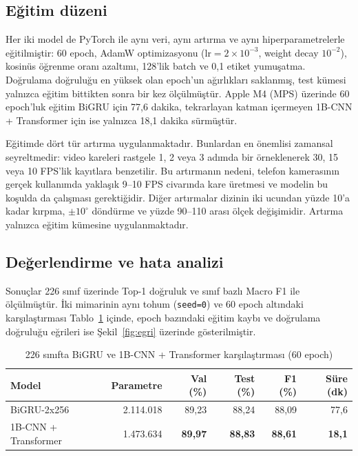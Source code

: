\subsection{Eğitim düzeni}

Her iki model de PyTorch ile aynı veri, aynı artırma ve aynı hiperparametrelerle
eğitilmiştir: 60 epoch, AdamW optimizasyonu ($\text{lr}=2\times10^{-3}$, weight
decay $10^{-2}$), kosinüs öğrenme oranı azaltımı, 128'lik batch ve 0,1 etiket
yumuşatma. Doğrulama doğruluğu en yüksek olan epoch'un ağırlıkları saklanmış,
test kümesi yalnızca eğitim bittikten sonra bir kez ölçülmüştür. Apple M4 (MPS)
üzerinde 60 epoch'luk eğitim BiGRU için 77,6 dakika, tekrarlayan katman
içermeyen 1B-CNN + Transformer için ise yalnızca 18,1 dakika sürmüştür.

Eğitimde dört tür artırma uygulanmaktadır. Bunlardan en önemlisi zamansal
seyreltmedir: video kareleri rastgele 1, 2 veya 3 adımda bir örneklenerek 30, 15
veya 10 FPS'lik kayıtlara benzetilir. Bu artırmanın nedeni, telefon kamerasının
gerçek kullanımda yaklaşık 9--10 FPS civarında kare üretmesi ve modelin bu
koşulda da çalışması gerektiğidir. Diğer artırmalar dizinin iki ucundan yüzde
10'a kadar kırpma, $\pm10^\circ$ döndürme ve yüzde 90--110 arası ölçek
değişimidir. Artırma yalnızca eğitim kümesine uygulanmaktadır.

\subsection{Değerlendirme ve hata analizi}

Sonuçlar 226 sınıf üzerinde Top-1 doğruluk ve sınıf bazlı Macro F1 ile
ölçülmüştür. İki mimarinin aynı tohum (\texttt{seed=0}) ve 60 epoch altındaki
karşılaştırması Tablo~\ref{tab:karsilastirma} içinde, epoch bazındaki eğitim
kaybı ve doğrulama doğruluğu eğrileri ise Şekil~\ref{fig:egri} üzerinde
gösterilmiştir.

\begin{table}[H]
\centering
\caption{226 sınıfta BiGRU ve 1B-CNN + Transformer karşılaştırması (60 epoch)}
\label{tab:karsilastirma}
\small
\setlength{\tabcolsep}{3.5pt}
\begin{tabular}{@{}lrrrrr@{}}
\toprule
\textbf{Model} & \textbf{Parametre} & \textbf{Val (\%)} & \textbf{Test (\%)} & \textbf{F1 (\%)} & \textbf{Süre (dk)} \\
\midrule
BiGRU-2x256 & 2.114.018 & 89,23 & 88,24 & 88,09 & 77,6 \\
1B-CNN + Transformer & 1.473.634 & \textbf{89,97} & \textbf{88,83} & \textbf{88,61} & \textbf{18,1} \\
\bottomrule
\end{tabular}
\end{table}


